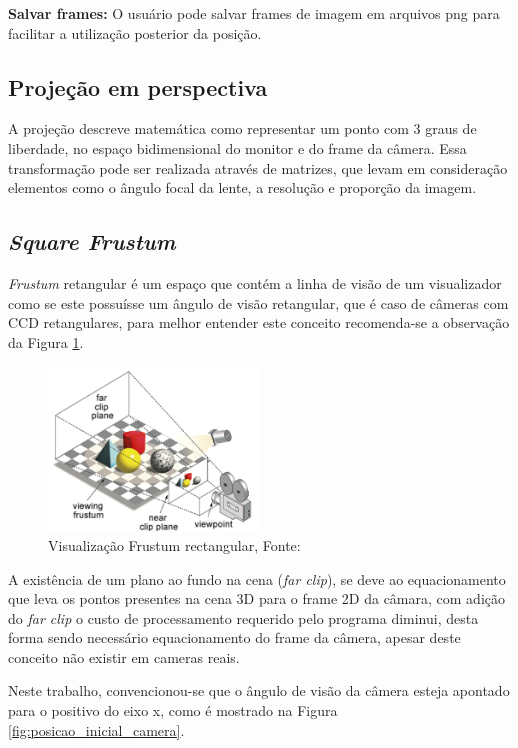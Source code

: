 \textbf{Salvar frames:} O usuário pode salvar frames de imagem em arquivos png para facilitar a utilização posterior da posição.

\subsection{Projeção em perspectiva}

A projeção descreve matemática como representar um ponto com 3 graus de liberdade, no espaço bidimensional do monitor e do frame da câmera. Essa transformação pode ser realizada através de matrizes, que levam em consideração elementos como o ângulo focal da lente, a resolução e proporção da imagem.

\subsection{\textit{Square Frustum}}

\textit{Frustum} retangular é um espaço que contém a linha de visão de  um visualizador como se este possuísse um ângulo de visão retangular, que é caso de câmeras com CCD retangulares, para melhor entender este conceito recomenda-se a observação da Figura \ref{fig:frustum}.

\begin{figure}[H]
    \centering
    \includegraphics[width=0.5\textwidth]{images/frustum.png}
    \caption{Visualização Frustum rectangular, Fonte: ~\cite[]{the_free_dictionary}}
    \label{fig:frustum}
\end{figure}

A existência de um plano ao fundo na cena (\textit{far clip}), 
se deve ao equacionamento que leva os pontos presentes na cena 3D para o frame 2D da câmara, 
com adição do \textit{far clip} o custo de processamento requerido pelo programa diminui, 
desta forma sendo necessário equacionamento do frame da câmera, apesar deste conceito não existir em cameras reais.

Neste trabalho, convencionou-se que o ângulo de visão da câmera esteja apontado para o positivo do eixo x, 
como é mostrado na Figura \ref{fig:posicao_inicial_camera}.

